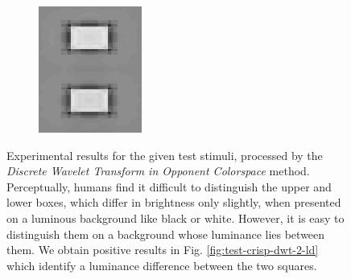 \documentclass[journal,onecolumn]{IEEEtran}
\begin{document}
{\begin{figure}[H]
\begin{subfigure}[b]{0.2\textwidth}
            \caption{}
            \label{fig:test-crisp-dwt-2-by}
    \end{subfigure}%
    \begin{subfigure}[b]{0.2\textwidth}
            \centering
            \includegraphics[width=.85\linewidth, frame]{test-crisp-dwt-3-by}
            \caption{}
            \label{fig:test-crisp-dwt-3-by}
    \end{subfigure}
    \caption{Experimental results for the given test stimuli, processed by the \textit{Discrete Wavelet Transform in Opponent Colorspace} method. Perceptually, humans find it difficult to distinguish the upper and lower boxes, which differ in brightness only slightly, when presented on a luminous background like black or white. However, it is easy to distinguish them on a background whose luminance lies between them. We obtain positive results in Fig. \ref{fig:test-crisp-dwt-2-ld} which identify a luminance difference between the two squares.}
\end{figure}
\clearpage
}

%
%
%
\end{document}
